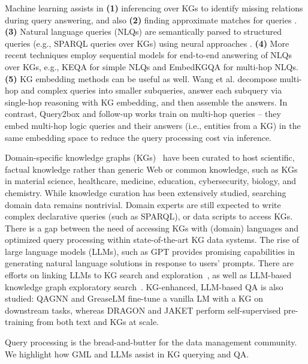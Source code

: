 \documentclass{sig-alternate-10pt}
\newcommand{\spara}[1]{\smallskip\noindent{\bf #1}}
\begin{document}
Machine learning assists in {\bf (1)} inferencing over KGs to identify missing relations during query answering, and also {\bf (2)} finding approximate matches for queries \cite{Abdallah023,HorchidanC23,abs-2303-14617}. {\bf (3)} Natural language queries (NLQs) are semantically parsed to structured queries (e.g., SPARQL queries over KGs) using neural approaches \cite{QuamarELO22}. {\bf (4)} More recent techniques employ sequential models for end-to-end answering of NLQs over KGs, e.g., KEQA \cite{HuangZLL19} for simple NLQs and EmbedKGQA \cite{SaxenaTT20} for multi-hop NLQs. {\bf (5)} KG embedding methods can be useful as well. Wang et al. \cite{WangKXJHF22,0001KWJY20} decompose multi-hop and complex queries into smaller subqueries, answer each subquery via single-hop reasoning with KG embedding, and then assemble the answers. In contrast,  Query2box \cite{RenHL20}  and follow-up works
train on multi-hop queries
– they embed multi-hop logic queries and their answers (i.e., entities
from a KG) in the same embedding space to reduce the query processing cost via inference.

Domain-specific knowledge graphs (KGs)~\cite{wang2022crux, li2020kg}
have been curated to host scientific,
factual knowledge rather than
generic Web or common knowledge,
such as KGs in material
science, healthcare, medicine, education,
cybersecurity, biology, and chemistry.
While knowledge curation has been extensively
studied, searching
domain data remains nontrivial.
Domain experts are still expected to
write complex declarative queries (such as
SPARQL), or data scripts to access KGs. There is a
gap between the need of accessing KGs with
(domain) languages
and optimized
query processing within
state-of-the-art KG data systems.
The rise of large language models (LLMs),
such as GPT provides promising capabilities in
generating natural language solutions in response to
users' prompts.
There are efforts on linking
LLMs to KG search and exploration~\cite{PanLWCWW24}, as well as LLM-based
knowledge graph
exploratory search~\cite{graphlingo}.
KG-enhanced, LLM-based QA is also studied: QAGNN \cite{YasunagaRBLL21} and GreaseLM \cite{ZBYRLML22} fine-tune a vanilla LM with a KG on downstream tasks, whereas DRAGON \cite{YasunagaBR0MLL22} and JAKET \cite{Yu0Y022} perform self-supervised pre-training from both text and KGs at scale.

\spara{Synergy.}
Query processing is the bread-and-butter for the data management community.
We highlight how GML and LLMs assist in KG querying and QA.
\end{document}

